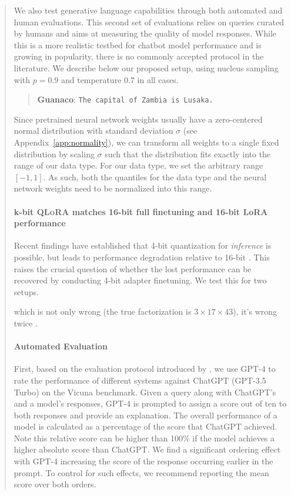 \begin{quote}
We also test generative language capabilities through both automated and human evaluations. This second set of evaluations relies on queries curated by humans and aims at measuring the quality of model responses. While this is a more realistic testbed for chatbot model performance and is growing in popularity, there is no commonly accepted protocol in the literature. We describe below our proposed setup, using nucleus sampling with $p=0.9$ and temperature $0.7$ in all cases.

\begin{quote} 
    \textbf{Guanaco}:
    \texttt{The capital of Zambia is Lusaka.}
\end{quote}

Since pretrained neural network weights usually have a zero-centered normal distribution with standard deviation $\sigma$ (see Appendix~\ref{app:normality}), we can transform all weights to a single fixed distribution by scaling $\sigma$ such that the distribution fits exactly into the range of our data type. For our data type, we set the arbitrary range $[-1, 1]$. As such, both the quantiles for the data type and the neural network weights need to be normalized into this range.

\paragraph{k-bit \textsc{QLoRA} matches 16-bit full finetuning and 16-bit LoRA performance} Recent findings have established that 4-bit quantization for \emph{inference} is possible, but leads to performance degradation relative to 16-bit \citep{dettmers2022case,frantar2022gptq}. This raises the crucial question of whether the lost performance can be recovered by conducting 4-bit adapter finetuning. We test this for two setups. 

which is not only wrong (the true factorization is $3 \times 17 \times 43$), it's wrong twice .

\paragraph{Automated Evaluation} First, based on the evaluation protocol introduced by \citet{vicuna2023}, we use GPT-4 to rate the performance of different systems against ChatGPT (GPT-3.5 Turbo) on the Vicuna benchmark. Given a query along with ChatGPT's and a model's responses, GPT-4 is prompted to assign a score out of ten to both responses and provide an explanation. The overall performance of a model is calculated as a percentage of the score that ChatGPT achieved. Note this relative score can be higher than 100\% if the model achieves a higher absolute score than ChatGPT. We find a significant ordering effect with GPT-4 increasing the score of the response occurring earlier in the prompt. To control for such effects, we recommend reporting the mean score over both orders.


\end{quote}
